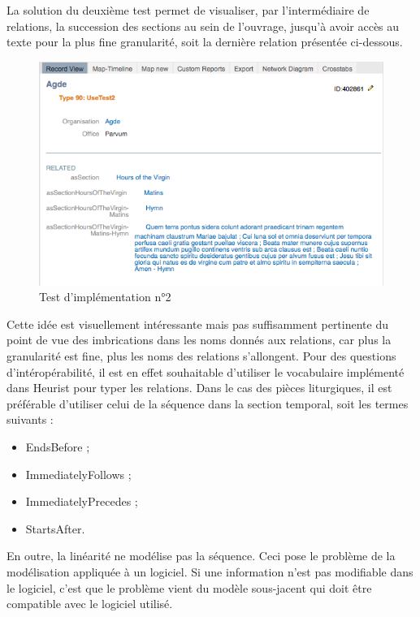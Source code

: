 \documentclass[a4paper,12pt,twoside]{book}
\begin{document}
 La solution du deuxième test permet de visualiser, par l'intermédiaire de relations, la succession des sections au sein de l’ouvrage, jusqu’à avoir accès au texte pour la plus fine granularité, soit la dernière relation présentée ci-dessous. 
 
    \begin{figure}[!h]
    \centering
    \includegraphics[width=15cm]{img/Modelisation/Tests_Implementation/UseTest2.png}
    \caption{Test d'implémentation n°2}
    \end{figure}
 
 Cette idée est visuellement intéressante mais pas suffisamment pertinente du point de vue des imbrications dans les noms donnés aux relations, car plus la granularité est fine, plus les noms des relations s'allongent. Pour des questions d'intéropérabilité, il est en effet souhaitable d'utiliser le vocabulaire implémenté dans Heurist pour typer les relations. Dans le cas des pièces liturgiques, il est préférable d'utiliser celui de la \og séquence\fg{} dans la section \og temporal\fg{}, soit les termes suivants :
 \begin{itemize}
     \item EndsBefore ;
     \item ImmediatelyFollows ;
     \item ImmediatelyPrecedes ;
     \item StartsAfter.
 \end{itemize} 
En outre, la linéarité ne modélise pas la séquence. Ceci pose le problème de la modélisation appliquée à un logiciel. Si une information n’est pas modifiable dans le logiciel, c'est que le problème vient du modèle sous-jacent qui doit être compatible avec le logiciel utilisé.\\
\end{document}
